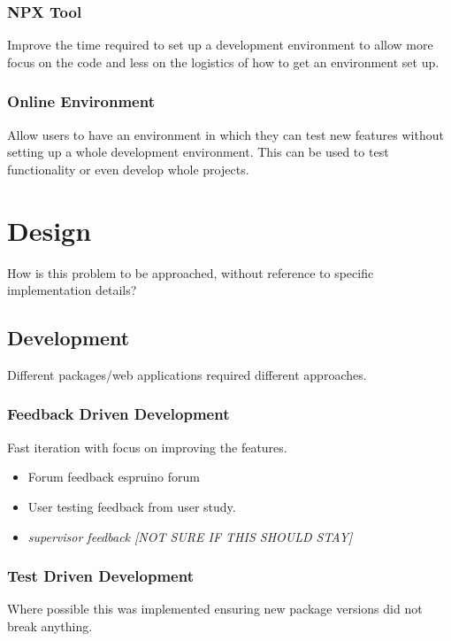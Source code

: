\documentclass{l4proj}
\begin{document}
\subsection{NPX Tool}
\text Improve the time required to set up a development environment to allow more focus on the code and less on the logistics of how to get an environment set up.

\subsection{Online Environment}
\text Allow users to have an environment in which they can test new features without setting up a whole development environment. This can be used to test functionality or even develop whole projects.
\chapter{Design}
How is this problem to be approached, without reference to specific implementation details? 

\section{Development}

Different packages/web applications required different approaches.

\subsection{Feedback Driven Development}
Fast iteration with focus on improving the features.
\begin{itemize}
    \item Forum feedback espruino forum
    
    \item User testing feedback from user study.
    \item \textit{supervisor feedback [NOT SURE IF THIS SHOULD STAY]}
\end{itemize}

\subsection{Test Driven Development}
Where possible this was implemented ensuring new package versions did not break anything.
\end{document}
